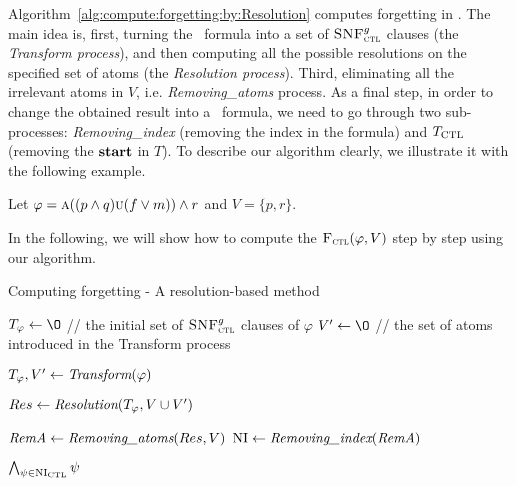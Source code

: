 \documentclass[letterpaper]{article}
\begin{document}
Algorithm~\ref{alg:compute:forgetting:by:Resolution} computes forgetting in \CTL.
The main idea is, first, turning the \CTL\ formula into a set of ${\textsc{SNF}_{\textsc{ctl}}^g}$ clauses (the \emph{Transform process}), and then computing all the possible resolutions on the specified set of atoms (the \emph{Resolution process}). Third, eliminating all the irrelevant atoms in $V$, i.e. \emph{Removing\_atoms} process. %
As a final step, in order to change the obtained result into a \CTL\ formula, we need to go through two sub-processes: \emph{Removing\_index} (removing the index in the formula) and $T_{\textrm{CTL}}$ (removing the $\textbf{start}$ in $T$).
To describe our algorithm clearly, we illustrate it with the following example.
\begin{example}\label{main:examp}
Let $\varphi=\textsc{a}((p\wedge q) \textsc{u} (f\vee m)) \wedge r$ and $V=\{p,r\}$.
\end{example}
In the following, we will show how to compute the ${\textsc{F}_{\textsc{ctl}}}(\varphi, V)$ step by step using our algorithm.


\begin{algorithm}[!h]
\caption{Computing forgetting - A resolution-based method}%
\label{alg:compute:forgetting:by:Resolution}
$T_{\varphi}\lto {\O}$ // the initial set of ${\textsc{SNF}_{\textsc{ctl}}^g}$ clauses of $\varphi$ \;
$V'\lto {\O}$ // the set of atoms introduced in the Transform process\;


$T_{\varphi}, V' \leftarrow \emph{Transform}(\varphi)$\;

$Res \leftarrow \emph{Resolution}(T_{\varphi}, V\cup V')$ \;

$\emph{RemA} \leftarrow \emph{Removing\_atoms}(Res, V)$ \;
$\textrm{NI} \leftarrow \emph{Removing\_index}(\emph{RemA})$ \; %


\Return $\bigwedge_{\psi \in \textrm{NI}_{\textrm{CTL}}} \psi$\;
\end{algorithm}

\end{document}
